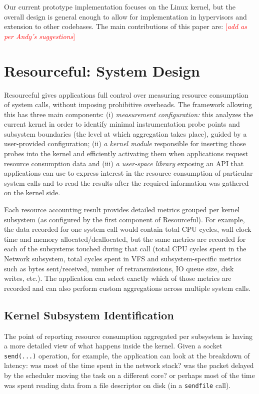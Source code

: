 \documentclass[letterpaper,twocolumn,10pt]{article}
\newcommand{\pname}{Resourceful}
\newcommand{\lnote}[1]{\textcolor{red}{[\textit{#1}]}} %
\begin{document}
Our current prototype implementation focuses on the Linux kernel, but the
overall design is general enough to allow for implementation in hypervisors and
extension to other codebases. The main contributions of this paper are:
\lnote{add as per Andy's suggestions}

\section{\pname: System Design} 

\pname{ }gives applications full control over measuring resource consumption of
system calls, without imposing prohibitive overheads. The framework allowing
this has three main components: (i) \textit{measurement configuration:} this
analyzes the current kernel in order to identify minimal instrumentation probe
points and subsystem boundaries (the level at which aggregation takes place),
guided by a user-provided configuration; (ii) \textit{a kernel module} responsible for
inserting those probes into the kernel and efficiently activating them when
applications request resource consumption data and (iii) \textit{a user-space library}
exposing an API that applications can use to express interest in the resource
consumption of particular system calls and to read the results after the
required information was gathered on the kernel side.

Each resource accounting result provides detailed metrics grouped per kernel
subsystem (as configured by the first component of \pname). For example, the data recorded
for one system call would contain total CPU cycles, wall clock time and memory
allocated/deallocated, but the same metrics are recorded for each of the
subsystems touched during that call (total CPU cycles spent in the Network
subsystem, total cycles spent in VFS and subsystem-specific metrics such as
bytes sent/received, number of retransmissions, IO queue size, disk writes,
etc.). The application can select exactly which of those metrics are recorded
and can also perform custom aggregations across multiple system calls.

\subsection{Kernel Subsystem Identification}
The point of reporting resource consumption aggregated per subsystem is having a
more detailed view of what happens inside the kernel. Given a socket
\texttt{send(...)} operation, for example, the application can look at the
breakdown of latency: was most of the time spent in the network stack? was the
packet delayed by the scheduler moving the task on a different core? or perhaps
most of the time was spent reading data from a file descriptor on disk (in a 
\texttt{sendfile} call).
 
\end{document}
